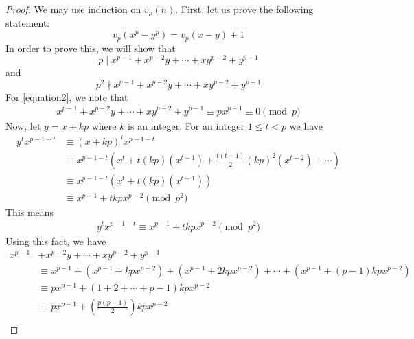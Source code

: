     \begin{proof}
        We may use induction on $v_p(n).$ First, let us prove the following statement:
            \begin{equation}\label{equation1}
                v_p(  x^p - y^p ) = v_p  ( x - y ) + 1
            \end{equation}
        In order to prove this, we will show that
            \begin{equation}\label{equation2}
                p \mid x^{p-1}+x^{p-2}y+\cdots+xy^{p-2}+y^{p-1}
            \end{equation}
        and
            \begin{equation}\label{equation3}
                p^2 \nmid x^{p-1}+x^{p-2}y+\cdots+xy^{p-2}+y^{p-1}
            \end{equation}
        For \eqref{equation2}, we note that
        \begin{align*}
        x^{p-1}+x^{p-2}y+\cdots+xy^{p-2}+y^{p-1} \equiv px^{p-1} \equiv 0 \pmod p
        \end{align*}
        Now, let $y=x+kp$ where $k$ is an integer. For an integer $ 1  \leq t <p$ we have
            \begin{align*}
                y^t x^{p-1-t}
                	& \equiv (x+kp)^t x^{p-1-t} \\
	                & \equiv x^{p-1-t} \left( x^t + t(kp)(x^{t-1})+ \frac{t(t-1)}{2} (kp)^2 (x^{t-2}) +\cdots \right) \\
	                & \equiv x^{p-1-t} \left( x^t + t(kp)(x^{t-1}) \right) \\
	                & \equiv x^{p-1}+tkpx^{p-2} \pmod{p^2}
            \end{align*}
        This means
            \begin{align*}
            	y^t x^{p-1-t} \equiv x^{p-1}+tkpx^{p-2} \pmod{p^2}
            \end{align*}
        Using this fact, we have
            \begin{align*}
                x^{p-1}& +x^{p-2}y+\cdots+xy^{p-2}+y^{p-1} \\
                & \equiv x^{p-1}+\left(x^{p-1}+kpx^{p-2}\right)+\left(x^{p-1}+2kpx^{p-2}\right)+\cdots+\left(x^{p-1} +(p-1)kpx^{p-2}\right) \\
                & \equiv px^{p-1} + \left(1+2+\cdots+p-1\right)kpx^{p-2} \\
                & \equiv px^{p-1} + \left( \frac{p(p-1)}{2} \right) kpx^{p-2} \\

\end{align*}
\end{proof}
